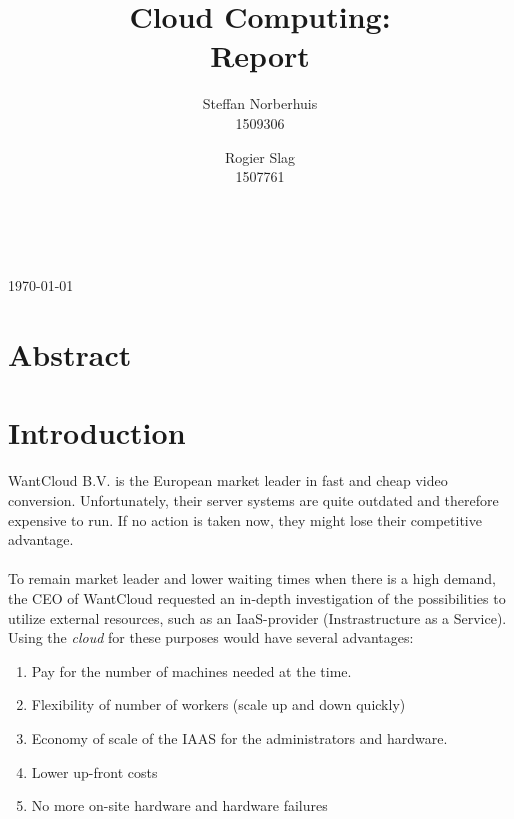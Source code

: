 \documentclass[a4paper]{IEEEtran}
\title{Cloud Computing: \\ Report}
\author{Steffan Norberhuis\\ 1509306 \and
 Rogier Slag\\ 1507761}
\author{
    \IEEEauthorblockN{Steffan Norberhuis, Rogier Slag}\\
    \IEEEauthorblockA{1509306, 1507761}
}
\begin{document}
\maketitle
\begin{center}
\today
\end{center}

\section{Abstract}


\section{Introduction}

WantCloud B.V. is the European market leader in fast and cheap video conversion.
Unfortunately, their server systems are quite outdated and therefore expensive to run.
If no action is taken now, they might lose their competitive advantage.\\
\\
To remain market leader and lower waiting times when there is a high demand, the CEO of WantCloud requested an in-depth investigation of the possibilities to utilize external resources, such as an IaaS-provider (Instrastructure as a Service).
Using the \textit{cloud} for these purposes would have several advantages:

\begin{enumerate}
\item Pay for the number of machines needed at the time.
\item Flexibility of number of workers (scale up and down quickly)
\item Economy of scale of the IAAS for the administrators and hardware.
\item Lower up-front costs
\item No more on-site hardware and hardware failures
\end{enumerate}
\end{document}
